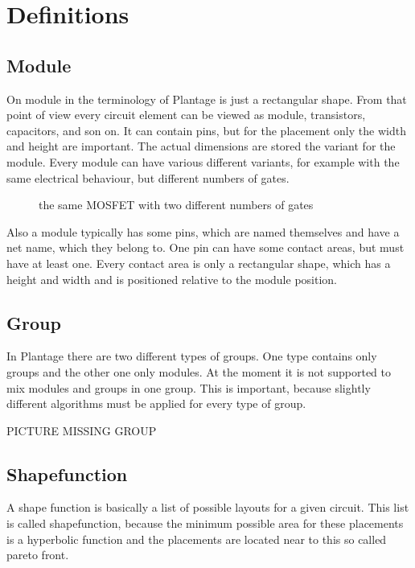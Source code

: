 \chapter{Definitions}

\section{Module}
On module in the terminology of Plantage is just a rectangular shape. From that point of view every circuit element can be viewed as module, transistors, capacitors, and son on. It can contain pins, but for the placement only the width and height are important. The actual dimensions are stored the variant for the module. Every module can have various different variants, for example with the same electrical behaviour, but different numbers of gates.

\begin{figure}
	\centering
	
	\caption{the same MOSFET with two different numbers of gates}
	\label{fig:modules_with_different_gate_number}
\end{figure}

Also a module typically has some pins, which are named themselves and have a net name, which they belong to. One pin can have some contact areas, but must have at least one. Every contact area is only a rectangular shape, which has a height and width and is positioned relative to the module position.

\section{Group}
In Plantage there are two different types of groups. One type contains only groups and the other one only modules. At the moment it is not supported to mix modules and groups in one group. This is important, because slightly different algorithms must be applied for every type of group.

PICTURE MISSING GROUP

\section{Shapefunction}
A shape function is basically a list of possible layouts for a given circuit. This list is called shapefunction, because the minimum possible area for these placements is a hyperbolic function and the placements are located near to this so called pareto front.

